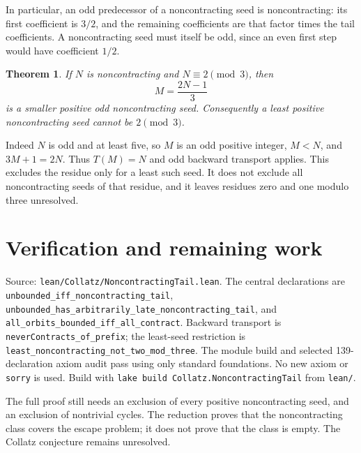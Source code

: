\documentclass[10pt]{article}
\newtheorem{theorem}{Theorem}
\begin{document}
In particular, an odd predecessor of a noncontracting seed is
noncontracting: its first coefficient is $3/2$, and the remaining
coefficients are that factor times the tail coefficients.
A noncontracting seed must itself be odd, since an even first step would
have coefficient $1/2$.
\begin{theorem}
If $N$ is noncontracting and $N\equiv2\pmod3$, then
\[
M=\frac{2N-1}{3}
\]
is a smaller positive odd noncontracting seed. Consequently a least
positive noncontracting seed cannot be $2\pmod3$.
\end{theorem}
Indeed $N$ is odd and at least five, so $M$ is an odd positive integer,
$M<N$, and $3M+1=2N$. Thus $T(M)=N$ and odd backward transport applies.
This excludes the residue only for a least such seed. It does not exclude
all noncontracting seeds of that residue, and it leaves residues zero
and one modulo three unresolved.

\section{Verification and remaining work}
{\raggedright
Source: \texttt{lean/Collatz/NoncontractingTail.lean}. The central
declarations are \texttt{unbounded\_iff\_noncontracting\_tail},
\texttt{unbounded\_has\_arbitrarily\_late\_noncontracting\_tail}, and
\texttt{all\_orbits\_bounded\_iff\_all\_contract}. Backward transport
is \texttt{neverContracts\_of\_prefix}; the least-seed restriction is
\texttt{least\_noncontracting\_not\_two\_mod\_three}.
The module build and selected 139-declaration axiom audit pass using only
standard foundations. No new axiom or \texttt{sorry} is used.
Build with \texttt{lake build Collatz.NoncontractingTail} from
\texttt{lean/}.\par}

The full proof still needs an exclusion of every positive noncontracting
seed, and an exclusion of nontrivial cycles. The reduction proves that the
noncontracting class covers the escape problem; it does not prove that the
class is empty. The Collatz conjecture remains unresolved.
\end{document}
